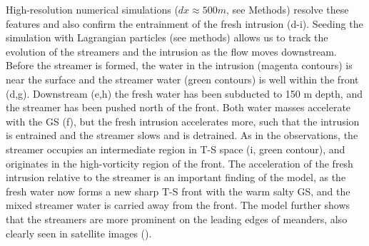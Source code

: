 \documentclass{article}
\begin{document}
High-resolution numerical simulations ($dx\approx 500 m$, see Methods) resolve these features and also confirm the entrainment of the fresh intrusion (d-i). Seeding the simulation with Lagrangian particles (see methods) allows us to track the evolution of the streamers and the intrusion as the flow moves downstream.  Before the streamer is formed, the water in the intrusion (magenta contours) is near the surface and the streamer water (green contours) is well within the front (d,g).  Downstream (e,h) the fresh water has been subducted to 150 m depth, and the streamer has been pushed north of the front.  Both water masses accelerate with the  GS  (f), but the fresh intrusion accelerates more, such that the intrusion is entrained and the streamer slows and is detrained.  As in the observations, the streamer occupies an intermediate region in T-S space (i, green contour), and originates in the high-vorticity region of the front.   The acceleration of the fresh intrusion relative to the streamer is an important finding of the model, as the fresh water now forms a new sharp T-S front with the warm salty GS, and the  mixed streamer water is carried away from the front.  The model further shows that the streamers are more prominent on the leading edges of meanders, also clearly seen in satellite images ().  

\end{document}
